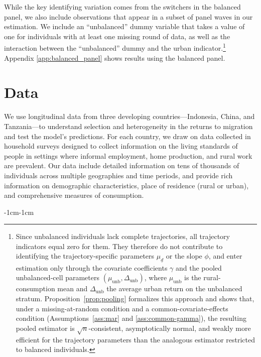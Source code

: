 \documentclass[12pt]{article}
\begin{document}
While the key identifying variation comes from the switchers in the balanced panel, we also include observations that appear in a subset of panel waves in our estimation.
We include an ``unbalanced'' dummy variable that takes a value of one for individuals with at least one missing round of data, as well as the interaction between the ``unbalanced'' dummy and the urban indicator.\footnote{Since unbalanced individuals lack complete trajectories, all trajectory indicators equal zero for them. They therefore do not contribute to identifying the trajectory-specific parameters $\mu_{\underline{d}}$ or the slope $\phi$, and enter estimation only through the covariate coefficients $\gamma$ and the pooled unbalanced-cell parameters $(\mu_{\mathrm{unb}},\Delta_{\mathrm{unb}})$, where $\mu_{\mathrm{unb}}$ is the rural-consumption mean and $\Delta_{\mathrm{unb}}$ the average urban return on the unbalanced stratum. Proposition~\ref{prop:pooling} formalizes this approach and shows that, under a missing-at-random condition and a common-covariate-effects condition (Assumptions~\ref{ass:mar} and \ref{ass:common-gamma}), the resulting pooled estimator is $\sqrt n$-consistent, asymptotically normal, and weakly more efficient for the trajectory parameters than the analogous estimator restricted to balanced individuals.}
Appendix \ref{app:balanced_panel} shows results using the balanced panel.

\section{Data}\label{sec:data}

We use longitudinal data from three developing countries---Indonesia, China, and Tanzania---to understand selection and heterogeneity in the returns to migration and test the model's predictions.
For each country, we draw on data collected in household surveys designed to collect information on the living standards of people in settings where informal employment, home production, and rural work are prevalent. 
Our data include detailed information on tens of thousands of individuals across multiple geographies and time periods, and provide rich information on demographic characteristics,  place of residence (rural or urban), and comprehensive measures of consumption.%



\begin{table}[htbp]
    \begin{adjustwidth}{-1cm}{-1cm}
        \centering
        
        \caption{Overview of Data Sources}\label{tab:data_overview}
    \end{adjustwidth}
\end{table}
\end{document}
